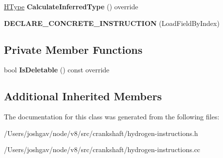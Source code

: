 \begin{DoxyCompactItemize}
\item 
\hyperlink{classv8_1_1internal_1_1_h_type}{H\+Type} {\bfseries Calculate\+Inferred\+Type} () override\hypertarget{classv8_1_1internal_1_1_h_load_field_by_index_a8e5ba6447d8fe15d6892e956bad7d689}{}\label{classv8_1_1internal_1_1_h_load_field_by_index_a8e5ba6447d8fe15d6892e956bad7d689}

\item 
{\bfseries D\+E\+C\+L\+A\+R\+E\+\_\+\+C\+O\+N\+C\+R\+E\+T\+E\+\_\+\+I\+N\+S\+T\+R\+U\+C\+T\+I\+ON} (Load\+Field\+By\+Index)\hypertarget{classv8_1_1internal_1_1_h_load_field_by_index_a126ac379709d948fc20c37acf527480a}{}\label{classv8_1_1internal_1_1_h_load_field_by_index_a126ac379709d948fc20c37acf527480a}

\end{DoxyCompactItemize}
\subsection*{Private Member Functions}
\begin{DoxyCompactItemize}
\item 
bool {\bfseries Is\+Deletable} () const  override\hypertarget{classv8_1_1internal_1_1_h_load_field_by_index_ac65669eac91caaa14af288d82cfb5907}{}\label{classv8_1_1internal_1_1_h_load_field_by_index_ac65669eac91caaa14af288d82cfb5907}

\end{DoxyCompactItemize}
\subsection*{Additional Inherited Members}


The documentation for this class was generated from the following files\+:\begin{DoxyCompactItemize}
\item 
/\+Users/joshgav/node/v8/src/crankshaft/hydrogen-\/instructions.\+h\item 
/\+Users/joshgav/node/v8/src/crankshaft/hydrogen-\/instructions.\+cc\end{DoxyCompactItemize}
